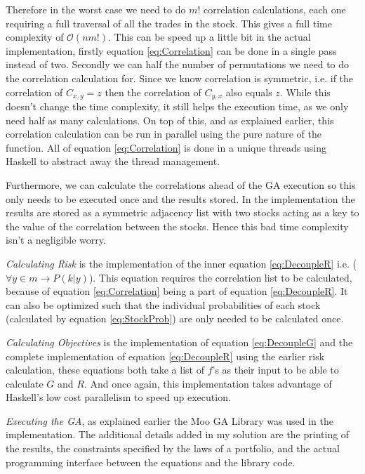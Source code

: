\documentclass[11pt]{article}
\newcommand{\bigO}{\mathcal{O}}
\begin{document}
    Therefore in the worst case we need to do \(m!\) correlation calculations, each one requiring a
    full traversal of all the trades in the stock. This gives a full time complexity of 
    \(\bigO (nm!) \). This can be speed up a little bit in the actual implementation, firstly
    equation \ref{eq:Correlation} can be done in a single pass instead of two. Secondly we can
    half the number of permutations we need to do the correlation calculation for. Since we know
    correlation is symmetric, i.e. if the correlation of \(C_{x,y} = z\) then the correlation
    of \(C_{y,x}\) also equals \(z\). While this doesn't change the time complexity, it still helps
    the execution time, as we only need half as many calculations. On top of this, and as explained
    earlier, this correlation calculation can be run in parallel using the pure nature of the function.
    All of equation \ref{eq:Correlation} is done in a unique threads using Haskell to abstract away
    the thread management.

    Furthermore, we can calculate the correlations ahead of the GA execution so this only needs to be
    executed once and the results stored. In the implementation the results are stored as a symmetric
    adjacency list with two stocks acting as a key to the value of the correlation between the stocks.
    Hence this bad time complexity isn't a negligible worry.

    \textit{Calculating Risk} is the implementation of the inner equation \ref{eq:DecoupleR} 
    i.e. (\(\forall y \in m \to P(k|y)\)). This equation
    requires the correlation list to be calculated, because of equation \ref{eq:Correlation} being a
    part of equation \ref{eq:DecoupleR}. It can also be optimized such that the individual
    probabilities of each stock (calculated by equation \ref{eq:StockProb}) are only needed to be
    calculated once.

    \textit{Calculating Objectives} is the implementation of equation \ref{eq:DecoupleG} and the complete
    implementation of equation \ref{eq:DecoupleR} using the earlier risk calculation, these
    equations both take a list of \(f\)'s as their input to be able to calculate \(G\) and \(R\).
    And once again, this implementation takes advantage of Haskell's low cost parallelism to speed
    up execution.

    \textit{Executing the GA}, as explained earlier the Moo GA Library \cite{Moo} was used in
    the implementation. The additional details added in my solution are the printing of the results,
    the constraints specified by the laws of a portfolio, and the actual programming interface
    between the equations and the library code.
\end{document}
